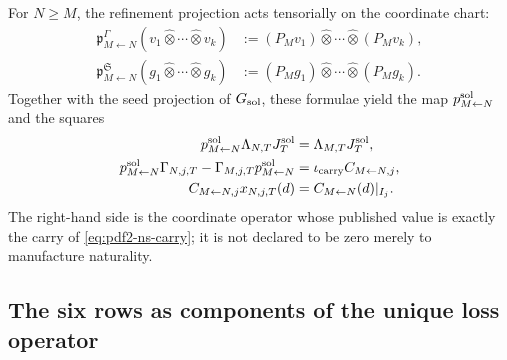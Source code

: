 For $N\ge M$, the refinement projection acts tensorially on the
coordinate chart:
\begin{equation}\label{eq:pdf2-ns-refinement-action}
 \begin{aligned}
 \mathfrak p_{M\leftarrow N}^{\Gamma}
 (v_1\widehat\otimes\cdots\widehat\otimes v_k)
 &:=(P_Mv_1)\widehat\otimes\cdots\widehat\otimes(P_Mv_k),\\
 \mathfrak p_{M\leftarrow N}^{\mathfrak S}
 (g_1\widehat\otimes\cdots\widehat\otimes g_k)
 &:=(P_Mg_1)\widehat\otimes\cdots\widehat\otimes(P_Mg_k).
 \end{aligned}
\end{equation}
Together with the seed projection of $\mathfrak G_{\rm sol}$, these formulae
yield the map $\mathfrak p_{M\leftarrow N}^{\rm sol}$ and the squares
\begin{equation}\label{eq:pdf2-ns-refinement-commutation}
 \begin{aligned}
 \mathfrak p_{M\leftarrow N}^{\rm sol}\Lambda_{N,T}J_T^{\rm sol}
 &=\Lambda_{M,T}J_T^{\rm sol},\\
 \mathfrak p_{M\leftarrow N}^{\rm sol}\Gamma_{N,j,T}
 -\Gamma_{M,j,T}\mathfrak p_{M\leftarrow N}^{\rm sol}
 &=\iota_{\rm carry}\mathcal C_{M\leftarrow N,j},\\
 \mathcal C_{M\leftarrow N,j}x_{N,j,T}(d)
 &=C_{M\leftarrow N}(d)|_{I_j}.
 \end{aligned}
\end{equation}
The right-hand side is the coordinate operator whose published value is
exactly the carry of
\eqref{eq:pdf2-ns-carry}; it is not declared to be zero merely to manufacture naturality.

\subsection{The six rows as components of the unique loss operator}

